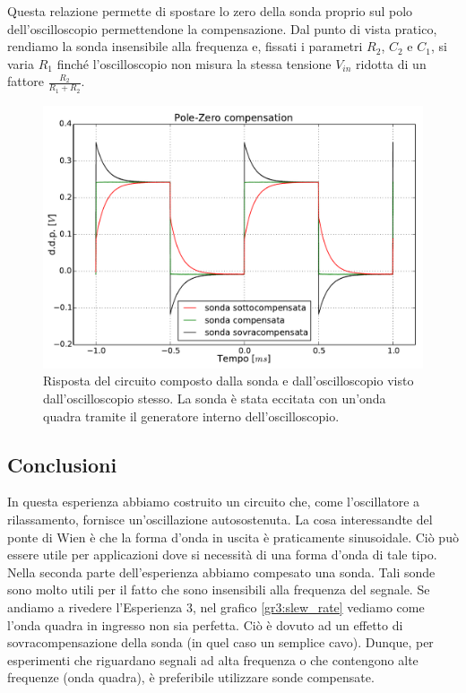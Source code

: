 Questa relazione permette di spostare lo zero della sonda proprio sul polo dell'oscilloscopio permettendone la compensazione.
Dal punto di vista pratico, rendiamo la sonda insensibile alla frequenza e, fissati i parametri $R_2$, $C_2$ e $C_1$, si varia $R_1$ finché l'oscilloscopio non misura la stessa tensione $V_{in}$ ridotta di un fattore $\frac{R_2}{R_1+R_2}$.

\begin{figure}[htpc]
\centering
\includegraphics[width=.65\textwidth]{../E08/latex/compensation.pdf}
\caption{Risposta del circuito composto dalla sonda e dall'oscilloscopio visto dall'oscilloscopio stesso. La sonda è stata eccitata con un'onda quadra tramite il generatore interno dell'oscilloscopio.}
\label{fig8:compensation}
\end{figure}

\subsection*{Conclusioni}
In questa esperienza abbiamo costruito un circuito che, come l'oscillatore a rilassamento, fornisce un'oscillazione autosostenuta. La cosa interessandte del ponte di Wien è che la forma d'onda in uscita è praticamente sinusoidale. Ciò può essere utile per applicazioni dove si necessità di una forma d'onda di tale tipo. Nella seconda parte dell'esperienza abbiamo compesato una sonda. Tali sonde sono molto utili per il fatto che sono insensibili alla frequenza del segnale. Se andiamo a rivedere l'Esperienza 3, nel grafico \ref{gr3:slew_rate} vediamo come l'onda quadra in ingresso non sia perfetta. Ciò è dovuto ad un effetto di sovracompensazione della sonda (in quel caso un semplice cavo). Dunque, per esperimenti che riguardano segnali ad alta frequenza o che contengono alte frequenze (onda quadra), è preferibile utilizzare sonde compensate.
